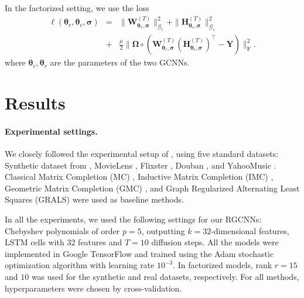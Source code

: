 \documentclass{article}
\begin{document}
In the factorized setting, we use the loss 
\begin{eqnarray}
\ell(\boldsymbol{\theta}_r, \boldsymbol{\theta}_c,\boldsymbol{\sigma}) &=& 
\| \mathbf{W}^{(T)}_{\boldsymbol{\theta}_r, \boldsymbol{\sigma}} \|_{\mathcal{G}_r}^2 + \| \mathbf{H}^{(T)}_{\boldsymbol{\theta}_c,\boldsymbol{\sigma}} \|_{\mathcal{G}_c}^2  \\
&+& \frac{\mu}{2} \| \boldsymbol{\Omega}\circ (\mathbf{W}^{(T)}_{\boldsymbol{\theta}_r,\boldsymbol{\sigma}} (\mathbf{H}^{(T)}_{\boldsymbol{\theta}_c,\boldsymbol{\sigma}} )^\top - \mathbf{Y}) \|_\mathrm{F}^2. \nonumber
\end{eqnarray}
where $\boldsymbol{\theta}_c, \boldsymbol{\theta}_r$ are the parameters of the two GCNNs. 

\section{Results}
\label{sec:results}

\label{sec:results}

\paragraph*{Experimental settings.} 
We closely followed the experimental setup of \cite{rao2015collaborative}, using five standard datasets: Synthetic dataset from \cite{kalofolias2014matrix}, MovieLens \cite{miller2003movielens}, Flixster \cite{jamali2010matrix}, Douban \cite{art:MaZhouLiuLyuKing11RecomSys}, and YahooMusic \cite{dror2012yahoo}. 
Classical Matrix Completion (MC) \cite{candes2012exact}, Inductive Matrix Completion (IMC) \cite{jain2013provable,xu2013speedup}, Geometric Matrix Completion (GMC) \cite{kalofolias2014matrix}, and Graph Regularized Alternating Least Squares (GRALS) \cite{rao2015collaborative} were used as baseline methods.  


In all the experiments, we used the following settings for our RGCNNs: Chebyshev polynomials of order $p=5$, outputting $k=32$-dimensional features, LSTM cells with $32$ features and $T=10$ diffusion steps. All the models were implemented in Google TensorFlow and trained using the Adam stochastic optimization algorithm \cite{KingmaB14} with learning rate $10^{-3}$. In factorized models, rank $r=15$ and $10$ was used for the synthetic and real datasets, respectively. 
For all methods, hyperparameters were chosen by cross-validation. 
\end{document}
